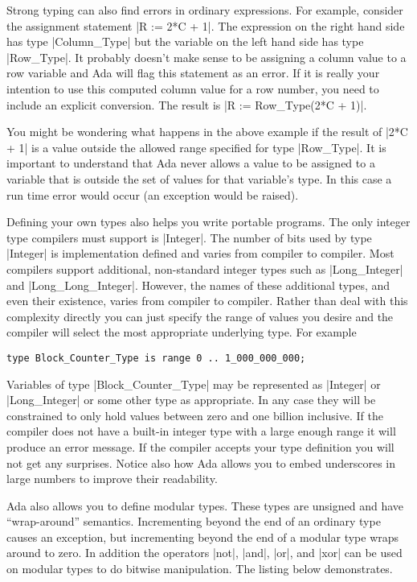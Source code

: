 Strong typing can also find errors in ordinary expressions. For example, consider the assignment
statement |R := 2*C + 1|. The expression on the right hand side has type |Column_Type| but the
variable on the left hand side has type |Row_Type|. It probably doesn't make sense to be
assigning a column value to a row variable and Ada will flag this statement as an error. If it
is really your intention to use this computed column value for a row number, you need to include
an explicit conversion. The result is |R := Row_Type(2*C + 1)|.

You might be wondering what happens in the above example if the result of |2*C + 1| is a value
outside the allowed range specified for type |Row_Type|. It is important to understand that Ada
never allows a value to be assigned to a variable that is outside the set of values for that
variable's type. In this case a run time error would occur (an exception would be raised).

Defining your own types also helps you write portable programs. The only integer type compilers
must support is |Integer|. The number of bits used by type |Integer| is implementation defined
and varies from compiler to compiler. Most compilers support additional, non-standard integer
types such as |Long_Integer| and |Long_Long_Integer|. However, the names of these additional
types, and even their existence, varies from compiler to compiler. Rather than deal with this
complexity directly you can just specify the range of values you desire and the compiler will
select the most appropriate underlying type. For example

\begin{lstlisting}
type Block_Counter_Type is range 0 .. 1_000_000_000;
\end{lstlisting}

Variables of type |Block_Counter_Type| may be represented as |Integer| or |Long_Integer| or some
other type as appropriate. In any case they will be constrained to only hold values between zero
and one billion inclusive. If the compiler does not have a built-in integer type with a large
enough range it will produce an error message. If the compiler accepts your type definition you
will not get any surprises. Notice also how Ada allows you to embed underscores in large numbers
to improve their readability.

Ada also allows you to define modular types. These types are unsigned and have ``wrap-around''
semantics. Incrementing beyond the end of an ordinary type causes an exception, but incrementing
beyond the end of a modular type wraps around to zero. In addition the operators |not|, |and|,
|or|, and |xor| can be used on modular types to do bitwise manipulation. The listing below
demonstrates.

